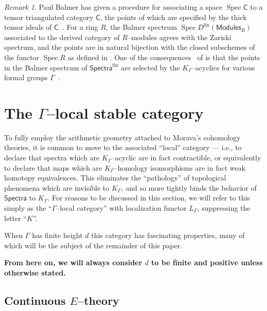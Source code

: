 \documentclass{amsart}
\newcommand{\<}{\langle}
\renewcommand{\>}{\rangle}
\newcommand{\CatOf}[1]{\mathsf{#1}}
\DeclareMathOperator{\Spec}{Spec}
\theoremstyle{plain}
\theoremstyle{definition}
\theoremstyle{remark}
\newtheorem*{remark}{Remark}
\begin{document}
\begin{remark}
Paul Balmer has given a procedure for associating a space $\Spec \CatOf C$ to a tensor triangulated category $\CatOf C$, the points of which are specified by the thick tensor ideals of $\CatOf C$~\cite{Balmer}.  For a ring $R$, the Balmer spectrum $\Spec D^{\text{fin}}(\CatOf{Modules}_R)$ associated to the derived category of $R$--modules agrees with the Zariski spectrum, and the points are in natural bijection with the closed subschemes of the functor $\Spec R$ as defined in .  One of the consequences~\cite[Theorem 7]{HopkinsSmith} of  is that the points in the Balmer spectrum of $\CatOf{Spectra}^{\text{fin}}$ are selected by the $K_\Gamma$--acyclics for various formal groups $\Gamma$~\cite[Corollary 9.5]{Balmer}.
\end{remark}




\section{The $\Gamma$--local stable category}\label{KLocalCategory}

To fully employ the arithmetic geometry attached to Morava's cohomology theories, it is common to move to the associated ``local'' category --- i.e., to declare that spectra which are $K_\Gamma$--acyclic are in fact contractible, or equivalently to declare that maps which are $K_\Gamma$--homology isomorphisms are in fact weak homotopy equivalences.  This eliminates the ``pathology'' of topological phenomena which are invisible to $K_\Gamma$, and so more tightly binds the behavior of $\CatOf{Spectra}$ to $K_\Gamma$.  For reasons to be discussed in this section, we will refer to this simply as the ``$\Gamma$--local category'' with localization functor $L_\Gamma$, suppressing the letter ``$K$''.

When $\Gamma$ has finite height $d$ this category has fascinating properties, many of which will be the subject of the remainder of this paper.

\begin{center}
\textbf{From here on, we will always consider $d$ to be finite and positive unless otherwise stated.}
\end{center}

\subsection{Continuous $E$--theory}\label{sec:ContinuousEThy}
\end{document}

